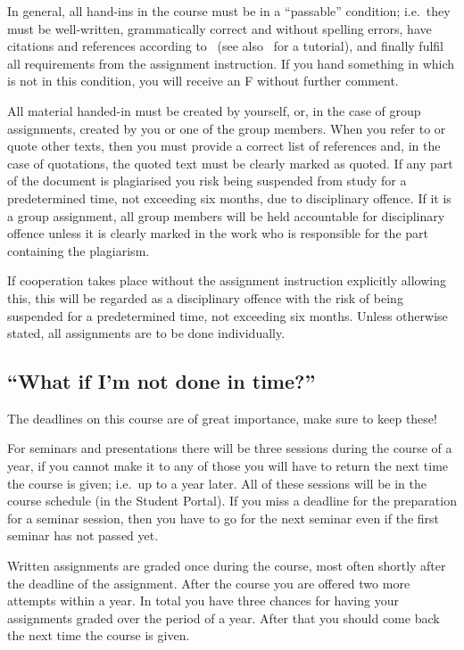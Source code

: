 \documentclass[a4paper]{llncs}
\begin{document}
In general, all hand-ins in the course must be in a \enquote{passable} 
condition; i.e.~they must be well-written, grammatically correct and without 
spelling errors, have citations and references according to~\cite{IEEEcitation} 
(see also~\cite{PurdueCitation} for a tutorial), and finally fulfil all 
requirements from the assignment instruction.
If you hand something in which is not in this condition, you will receive an 
F without further comment.

All material handed-in must be created by yourself, or, in the case of group 
assignments, created by you or one of the group members.
When you refer to or quote other texts, then you must provide a correct list of 
references and, in the case of quotations, the quoted text must be clearly 
marked as quoted.
If any part of the document is plagiarised you risk being suspended from study 
for a predetermined time, not exceeding six months, due to disciplinary 
offence.
If it is a group assignment, all group members will be held accountable for 
disciplinary offence unless it is clearly marked in the work who is responsible 
for the part containing the plagiarism.

If cooperation takes place without the assignment instruction explicitly 
allowing this, this will be regarded as a disciplinary offence with the risk of
being suspended for a predetermined time, not exceeding six months.
Unless otherwise stated, all assignments are to be done individually.

\subsection{\enquote{What if I'm not done in time?}}
\label{sec:late}
The deadlines on this course are of great importance, make sure to keep these!

For seminars and presentations there will be three sessions during the course 
of a year, if you cannot make it to any of those you will have to return the 
next time the course is given; i.e.~up to a year later.
All of these sessions will be in the course schedule (in the Student Portal).
If you miss a deadline for the preparation for a seminar session, then you have 
to go for the next seminar even if the first seminar has not passed yet.

Written assignments are graded once during the course, most often shortly after 
the deadline of the assignment.
After the course you are offered two more attempts within a year.
In total you have three chances for having your assignments graded over the 
period of a year.
After that you should come back the next time the course is given.
\end{document}
